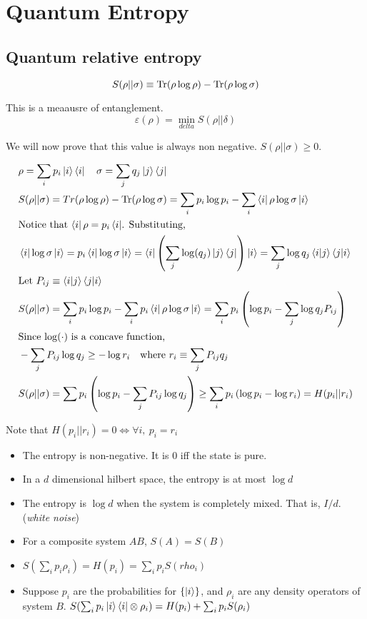 \chapter{Quantum Entropy}

\section{Quantum relative entropy}
$$S(\rho || \sigma) \equiv \Tr(\rho \log \rho) - \Tr (\rho \log \sigma)$$

This is a meaausre of entanglement.
$$\varepsilon(\rho) = \min_{delta} S(\rho ||\delta)$$

We will now prove that this value is always non negative.
$S(\rho || \sigma) \geq 0$.

\begin{align*}
&\rho = \sum_i p_i \ket{i} \bra{i} \quad \sigma = \sum_j q_j \ket{j} \bra{j} \\
&S(\rho || \sigma) = Tr(\rho \log \rho) - \Tr(\rho \log \sigma) = \sum_i p_i \log p_i - \sum_i \bra{i} \rho \log \sigma \ket{i} \\
&\text{Notice that $\bra{i} \rho = p_i \bra{i}$. Substituting,} \\
&\bra{i} \log \sigma \ket{i} = p_i \bra{i} \log \sigma \ket{i} = \bra{i} \left( \sum_j \log(q_j) \ket{j}\bra{j} \right) \ket{i} =
\sum_j \log q_j \bra{i}\ket{j} \bra{j}\ket{i} \\
&\text{Let $P_{ij} \equiv\bra{i}\ket{j} \bra{j}\ket{i}$} \\
&S(\rho || \sigma) = \sum_i p_i \log p_i - \sum_i p_i \bra{i} \rho \log \sigma \ket{i} 
= \sum_i p_i \left(\log p_i - \sum_j \log q_j P_{ij} \right) \\
&\text{Since $\log(\cdot)$ is a concave function,} \\
&-\sum_j P_{ij} \log q_j \geq - \log r_i \quad \text{where $r_i \equiv \sum_j P_{ij} q_j$}\\
&S(\rho || \sigma) = \sum p_i \left( \log p_i - \sum_j P_{ij} \log q_j \right) \geq
\sum_i p_i \left( \log p_i - \log r_i \right) = H(p_i || r_i)
\end{align*}

Note that $H(p_i || r_i) = 0 \iff \forall i, ~p_i = r_i $

\begin{itemize}
\item The entropy is non-negative. It is 0 iff the state is pure.
\item In a $d$ dimensional hilbert space, the entropy is at most $\log d$
\item The entropy is $\log d$ when the system is completely mixed. That is,
$I / d$. (\emph{white noise})
\item For a composite system $AB$, $S(A) = S(B)$
\item $S(\sum_i p_i \rho_i) = H(p_i) = \sum_i p_i S(rho_i)$
\item Suppose $p_i$ are the probabilities for $\{ \ket{i} \}$, and $\rho_i$ are
any density operators of system $B$. $S(\sum_i p_i \ket{i}\bra{i} \otimes \rho_i) = H(p_i) + \sum_i p_i S(\rho_i)$
\end{itemize}

